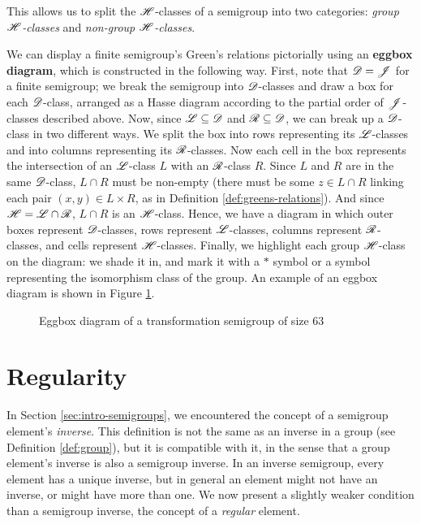 This allows us to split the $\mathrel{\mathscr{H}}$-classes of a semigroup into two categories:
\textit{group $\mathrel{\mathscr{H}}$-classes} and \textit{non-group $\mathrel{\mathscr{H}}$-classes}.

We can display a finite semigroup's Green's relations pictorially using an
\textbf{eggbox diagram}, which is constructed in the following way.  First, note
that $\mathscr{D} = \mathscr{J}$ for a finite semigroup; we break the semigroup into
$\mathscr{D}$-classes and draw a box for each $\mathscr{D}$-class, arranged as a Hasse diagram
according to the partial order of $\mathscr{J}$-classes described above.  Now, since
$\mathscr{L} \subseteq \mathscr{D}$ and $\mathscr{R} \subseteq \mathscr{D}$, we can break up a $\mathscr{D}$-class in
two different ways.  We split the box into rows representing its $\mathscr{L}$-classes
and into columns representing its $\mathscr{R}$-classes.  Now each cell in the box
represents the intersection of an $\mathscr{L}$-class $L$ with an $\mathscr{R}$-class $R$.
Since $L$ and $R$ are in the same $\mathscr{D}$-class, $L \cap R$ must be non-empty
(there must be some $z \in L \cap R$ linking each pair $(x,y) \in L \times R$,
as in Definition \ref{def:greens-relations}).  And since $\mathscr{H} = \mathscr{L} \cap \mathscr{R}$,
$L \cap R$ is an $\mathscr{H}$-class.  Hence, we have a diagram in which outer boxes
represent $\mathscr{D}$-classes, rows represent $\mathscr{L}$-classes, columns represent
$\mathscr{R}$-classes, and cells represent $\mathscr{H}$-classes.  Finally, we highlight each
group $\mathscr{H}$-class on the diagram: we shade it in, and mark it with a $*$ symbol
or a symbol representing the isomorphism class of the group.  An example of an
eggbox diagram is shown in Figure \ref{fig:eggbox-diagram}.

\begin{figure}[p]
  \centering
  
  \caption{Eggbox diagram of a transformation semigroup of size 63}
  \label{fig:eggbox-diagram}
\end{figure}

\section{Regularity}
\label{sec:intro-regularity}

In Section \ref{sec:intro-semigroups}, we encountered the concept of a semigroup
element's \textit{inverse}.  This definition is not the same as an inverse in a
group (see Definition \ref{def:group}), but it is compatible with it, in the
sense that a group element's inverse is also a semigroup inverse.  In an inverse
semigroup, every element has a unique inverse, but in general an element might
not have an inverse, or might have more than one.  We now present a slightly
weaker condition than a semigroup inverse, the concept of a \textit{regular}
element.

